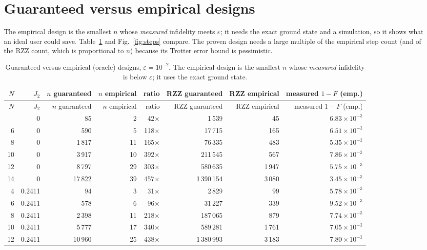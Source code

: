 \documentclass[11pt]{article}
\begin{document}
\section{Guaranteed versus empirical designs}\label{sec:emp}
The empirical design is the smallest $n$ whose \emph{measured} infidelity meets $\varepsilon$; it needs the exact ground state and a simulation, so it shows what an ideal user could save. Table~\ref{tab:ge} and Fig.~\ref{fig:steps} compare. The proven design needs a large multiple of the empirical step count (and of the RZZ count, which is proportional to $n$) because its Trotter error bound is pessimistic.
{\small
\begin{longtable}{rrrrrrrr}
\caption{Guaranteed versus empirical (oracle) designs, $\varepsilon=10^{-2}$. The empirical design is the smallest $n$ whose \emph{measured} infidelity is below $\varepsilon$; it uses the exact ground state.}\label{tab:ge}\\
\toprule
$N$ & $J_2$ & $n$ guaranteed & $n$ empirical & ratio & RZZ guaranteed & RZZ empirical & measured $1-F$ (emp.) \\
\midrule
\endfirsthead
\toprule
$N$ & $J_2$ & $n$ guaranteed & $n$ empirical & ratio & RZZ guaranteed & RZZ empirical & measured $1-F$ (emp.) \\
\midrule
\endhead
\bottomrule
\endfoot
4 & 0 & 85 & 2 & 42$\times$ & 1\,539 & 45 & $6.83\times10^{-3}$ \\
6 & 0 & 590 & 5 & 118$\times$ & 17\,715 & 165 & $6.51\times10^{-3}$ \\
8 & 0 & 1\,817 & 11 & 165$\times$ & 76\,335 & 483 & $5.35\times10^{-3}$ \\
10 & 0 & 3\,917 & 10 & 392$\times$ & 211\,545 & 567 & $7.86\times10^{-3}$ \\
12 & 0 & 8\,797 & 29 & 303$\times$ & 580\,635 & 1\,947 & $5.75\times10^{-3}$ \\
14 & 0 & 17\,822 & 39 & 457$\times$ & 1\,390\,154 & 3\,080 & $3.45\times10^{-3}$ \\
4 & 0.2411 & 94 & 3 & 31$\times$ & 2\,829 & 99 & $5.78\times10^{-3}$ \\
6 & 0.2411 & 578 & 6 & 96$\times$ & 31\,227 & 339 & $9.52\times10^{-3}$ \\
8 & 0.2411 & 2\,398 & 11 & 218$\times$ & 187\,065 & 879 & $7.74\times10^{-3}$ \\
10 & 0.2411 & 5\,777 & 17 & 340$\times$ & 589\,281 & 1\,761 & $7.05\times10^{-3}$ \\
12 & 0.2411 & 10\,960 & 25 & 438$\times$ & 1\,380\,993 & 3\,183 & $7.80\times10^{-3}$ \\

\end{longtable}}
\end{document}
